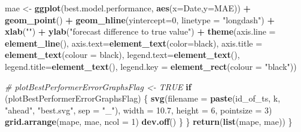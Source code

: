 \documentclass[
]{article}
\newenvironment{Shaded}{\begin{snugshade}}{\end{snugshade}}
\newcommand{\AttributeTok}[1]{\textcolor[rgb]{0.13,0.29,0.53}{#1}}
\newcommand{\CommentTok}[1]{\textcolor[rgb]{0.56,0.35,0.01}{\textit{#1}}}
\newcommand{\ControlFlowTok}[1]{\textcolor[rgb]{0.13,0.29,0.53}{\textbf{#1}}}
\newcommand{\DecValTok}[1]{\textcolor[rgb]{0.00,0.00,0.81}{#1}}
\newcommand{\FloatTok}[1]{\textcolor[rgb]{0.00,0.00,0.81}{#1}}
\newcommand{\FunctionTok}[1]{\textcolor[rgb]{0.13,0.29,0.53}{\textbf{#1}}}
\newcommand{\NormalTok}[1]{#1}
\newcommand{\OtherTok}[1]{\textcolor[rgb]{0.56,0.35,0.01}{#1}}
\newcommand{\SpecialCharTok}[1]{\textcolor[rgb]{0.81,0.36,0.00}{\textbf{#1}}}
\newcommand{\StringTok}[1]{\textcolor[rgb]{0.31,0.60,0.02}{#1}}
\begin{document}
\begin{Shaded}
\begin{Highlighting}[]
\NormalTok{    mae }\OtherTok{\textless{}{-}} \FunctionTok{ggplot}\NormalTok{(best.model.performance, }\FunctionTok{aes}\NormalTok{(}\AttributeTok{x=}\NormalTok{Date,}\AttributeTok{y=}\NormalTok{MAE)) }\SpecialCharTok{+} \FunctionTok{geom\_point}\NormalTok{() }\SpecialCharTok{+} \FunctionTok{geom\_hline}\NormalTok{(}\AttributeTok{yintercept=}\DecValTok{0}\NormalTok{, }\AttributeTok{linetype =} \StringTok{"longdash"}\NormalTok{) }\SpecialCharTok{+} \FunctionTok{xlab}\NormalTok{(}\StringTok{""}\NormalTok{) }\SpecialCharTok{+} \FunctionTok{ylab}\NormalTok{(}\StringTok{"forecast difference to true value"}\NormalTok{) }\SpecialCharTok{+} \FunctionTok{theme}\NormalTok{(}\AttributeTok{axis.line =} \FunctionTok{element\_line}\NormalTok{(), }\AttributeTok{axis.text=}\FunctionTok{element\_text}\NormalTok{(}\AttributeTok{color=}\StringTok{\textquotesingle{}black\textquotesingle{}}\NormalTok{), }\AttributeTok{axis.title =} \FunctionTok{element\_text}\NormalTok{(}\AttributeTok{colour =} \StringTok{\textquotesingle{}black\textquotesingle{}}\NormalTok{), }\AttributeTok{legend.text=}\FunctionTok{element\_text}\NormalTok{(), }\AttributeTok{legend.title=}\FunctionTok{element\_text}\NormalTok{(), }\AttributeTok{legend.key =} \FunctionTok{element\_rect}\NormalTok{(}\AttributeTok{colour =} \StringTok{"black"}\NormalTok{))}
    
    \CommentTok{\# plotBestPerformerErrorGraphsFlag \textless{}{-} TRUE}
    \ControlFlowTok{if}\NormalTok{ (plotBestPerformerErrorGraphsFlag) \{}
      \FunctionTok{svg}\NormalTok{(}\AttributeTok{filename =} \FunctionTok{paste}\NormalTok{(id\_of\_ts, k, }\StringTok{"ahead"}\NormalTok{, }\StringTok{"best.svg"}\NormalTok{, }\AttributeTok{sep =} \StringTok{"\_"}\NormalTok{), }\AttributeTok{width =} \FloatTok{10.7}\NormalTok{, }\AttributeTok{height =} \DecValTok{6}\NormalTok{, }\AttributeTok{pointsize =} \DecValTok{3}\NormalTok{)}
      \FunctionTok{grid.arrange}\NormalTok{(mape, mae, }\AttributeTok{ncol =} \DecValTok{1}\NormalTok{)}
      \FunctionTok{dev.off}\NormalTok{()}
\NormalTok{    \}}
\NormalTok{  \}}
  \FunctionTok{return}\NormalTok{(}\FunctionTok{list}\NormalTok{(mape, mae))}
\NormalTok{\}}


\end{Highlighting}
\end{Shaded}
\end{document}
